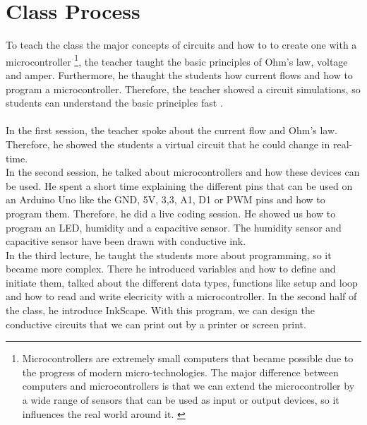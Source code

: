 \documentclass[00_doc.tex]{subfiles}
\begin{document}
    \section{Class Process}
    \begin{flushleft}
        To teach the class the major concepts of circuits and how to to create one with a 
        microcontroller {\footnote{\label{foot: microcontroller} Microcontrollers are extremely 
        small computers that became possible due to the progress of modern micro-technologies. 
        The major difference between computers and microcontrollers is that we can extend the 
        microcontroller by a wide range of sensors that can be used as input or output devices, 
        so it influences the real world around it. \cite{Schief1997, Dembowski2014}}}, the teacher 
        taught the basic principles of Ohm's law, voltage and amper. Furthermore, he thaught the 
        students how current flows and how to program a microcontroller. Therefore, the teacher 
        showed a circuit simulations, so students can understand the basic principles fast 
        \cite{Wegener2020}. \\~\\

        In the first session, the teacher spoke about the current flow and Ohm's law. Therefore, he 
        showed the students a virtual circuit that he could change in real-time.\\

        In the second session, he talked about microcontrollers and how these devices can be used. 
        He spent a short time explaining the different pins that can be used on an Arduino Uno 
        like the GND, 5V, 3,3, A1, D1 or PWM pins and how to program them. Therefore, he did a 
        live coding session.  He showed us how to program an LED, humidity and a capacitive sensor. 
        The humidity sensor and capacitive sensor have been drawn with conductive ink.\\

        In the third lecture, he taught the students more about programming, so it became more 
        complex. There he introduced variables and how to define and initiate them, talked about
        the different data types, functions like setup and loop and how to read and write elecricity
        with a microcontroller. In the second half of the class, he introduce InkScape. With this 
        program, we can design the conductive circuits that we can print out by a printer or 
        screen print.\\


\end{flushleft}
\end{document}
